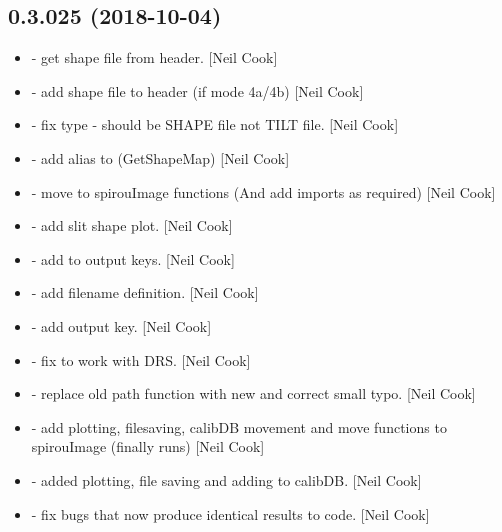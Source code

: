\documentclass[a4paper,10pt,english]{report}
\begin{document}
\subsection{0.3.025 (2018-10-04)}
\label{\detokenize{misc/changelog:id306}}\begin{itemize}
\item {} 
 - get shape file from header. {[}Neil Cook{]}

\item {} 
 - add shape file to header (if mode 4a/4b)
{[}Neil Cook{]}

\item {} 
 - fix type - should be SHAPE file not TILT file.
{[}Neil Cook{]}

\item {} 
 - add alias to  (GetShapeMap)
{[}Neil Cook{]}

\item {} 
 - move  to spirouImage functions (And add
imports as required) {[}Neil Cook{]}

\item {} 
 - add slit shape plot. {[}Neil Cook{]}

\item {} 
 - add  to output keys. {[}Neil Cook{]}

\item {} 
 - add  filename definition. {[}Neil Cook{]}

\item {} 
 - add  output key. {[}Neil Cook{]}

\item {} 
 - fix to work with DRS. {[}Neil Cook{]}

\item {} 
 - replace old path function with new and correct
small typo. {[}Neil Cook{]}

\item {} 
 - add plotting, filesaving, calibDB movement and
move functions to spirouImage (finally runs) {[}Neil Cook{]}

\item {} 
 - added plotting, file saving and adding to
calibDB. {[}Neil Cook{]}

\item {} 
 - fix bugs that now produce identical results to
 code. {[}Neil Cook{]}

\end{itemize}
\end{document}
